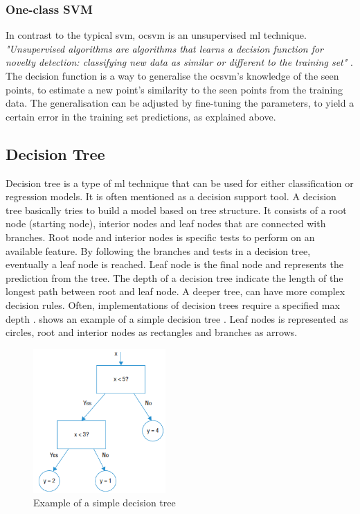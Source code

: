 \documentclass[english, a4paper]{report}
\begin{document}
{{{            \subsubsection{One-class SVM} \label{oneclassSVM}
            {   
                In contrast to the typical \gls{svm}, \gls{ocsvm} is an unsupervised \gls{ml} technique. \textit{"Unsupervised algorithms are algorithms that learns a decision function for novelty detection: classifying new data as similar or different to the training set"} \cite{scikit-learn}. The decision function is a way to generalise the \gls{ocsvm}'s knowledge of the seen points, to estimate a new point's similarity to the seen points from the training data. The generalisation can be adjusted by fine-tuning the parameters, to yield a certain error in the training set predictions, as explained above. 
            }
        }
        
        \subsection{Decision Tree}\label{DecisionTreeTheory}
        {
            Decision tree is a type of \gls{ml} technique that can be used for either classification or regression models. It is often mentioned as a decision support tool. A decision tree basically tries to build a model based on tree structure. It consists of a root node (starting node), interior nodes and leaf nodes that are connected with branches. Root node and interior nodes is specific tests to perform on an available feature. By following the branches and tests in a decision tree, eventually a leaf node is reached. Leaf node is the final node and represents the prediction from the tree. The depth of a decision tree indicate the length of the longest path between root and leaf node. A deeper tree, can have more complex decision rules. Often, implementations of decision trees require a specified max depth \cite{mlKelleher}.  shows an example of a simple decision tree \cite{mlInPython}. Leaf nodes is represented as circles, root and interior nodes as rectangles and branches as arrows. 
            
            \begin{figure}[H]
                \centering
                \includegraphics[width=0.45\textwidth]{DecisionTreeExample}
                \caption{Example of a simple decision tree \cite{mlInPython}}
                \label{fig:DecisionTreeExample}
            \end{figure}   
        }
        
}}
\end{document}
